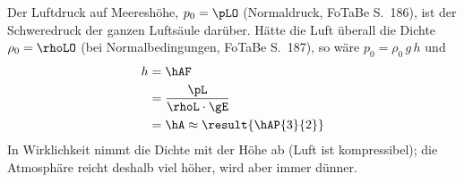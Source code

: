 Der Luftdruck auf Meereshöhe, $p_0 = \pLO$ (Normaldruck, FoTaBe S.~186), ist der Schweredruck der ganzen Luftsäule darüber. Hätte die Luft überall die Dichte $\rho_0 = \rhoLO$ (bei Normalbedingungen, FoTaBe S.~187), so wäre $p_0 = \rho_0\,g\,h$ und
\begin{align}
 h &= \hAF \\
   &= \frac{\pL}{\rhoL\cdot\gE} \\
   &= \hA \approx \result{\hAP{3}{2}}
\end{align}
In Wirklichkeit nimmt die Dichte mit der Höhe ab (Luft ist kompressibel); die Atmosphäre reicht deshalb viel höher, wird aber immer dünner.
